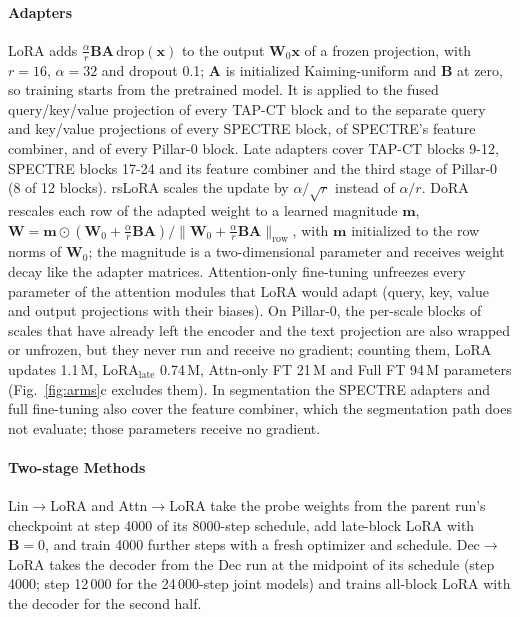 \paragraph{Adapters} LoRA \citep{hu2022lora} adds $\tfrac{\alpha}{r}\bm{B}\bm{A}\,\mathrm{drop}(\bm{x})$ to the output $\bm{W}_0\bm{x}$ of a frozen projection, with $r=16$, $\alpha=32$ and dropout 0.1; $\bm{A}$ is initialized Kaiming-uniform and $\bm{B}$ at zero, so training starts from the pretrained model. It is applied to the fused query/key/value projection of every TAP-CT block and to the separate query and key/value projections of every SPECTRE block, of SPECTRE's feature combiner, and of every Pillar-0 block. Late adapters cover TAP-CT blocks 9-12, SPECTRE blocks 17-24 and its feature combiner and the third stage of Pillar-0 (8 of 12 blocks). rsLoRA scales the update by $\alpha/\sqrt{r}$ instead of $\alpha/r$. DoRA \citep{liu2024dora} rescales each row of the adapted weight to a learned magnitude $\bm{m}$, $\bm{W}=\bm{m}\odot(\bm{W}_0+\tfrac{\alpha}{r}\bm{B}\bm{A})/\lVert\bm{W}_0+\tfrac{\alpha}{r}\bm{B}\bm{A}\rVert_{\text{row}}$, with $\bm{m}$ initialized to the row norms of $\bm{W}_0$; the magnitude is a two-dimensional parameter and receives weight decay like the adapter matrices. Attention-only fine-tuning unfreezes every parameter of the attention modules that LoRA would adapt (query, key, value and output projections with their biases). On Pillar-0, the per-scale blocks of scales that have already left the encoder and the text projection are also wrapped or unfrozen, but they never run and receive no gradient; counting them, LoRA updates 1.1\,M, LoRA$_{\text{late}}$ 0.74\,M, Attn-only FT 21\,M and Full FT 94\,M parameters (Fig.~\ref{fig:arms}c excludes them). In segmentation the SPECTRE adapters and full fine-tuning also cover the feature combiner, which the segmentation path does not evaluate; those parameters receive no gradient.

\paragraph{Two-stage Methods} Lin$\to$LoRA and Attn$\to$LoRA take the probe weights from the parent run's checkpoint at step 4000 of its 8000-step schedule, add late-block LoRA with $\bm{B}=0$, and train 4000 further steps with a fresh optimizer and schedule. Dec$\to$LoRA takes the decoder from the Dec run at the midpoint of its schedule (step 4000; step 12\,000 for the 24\,000-step joint models) and trains all-block LoRA with the decoder for the second half.

